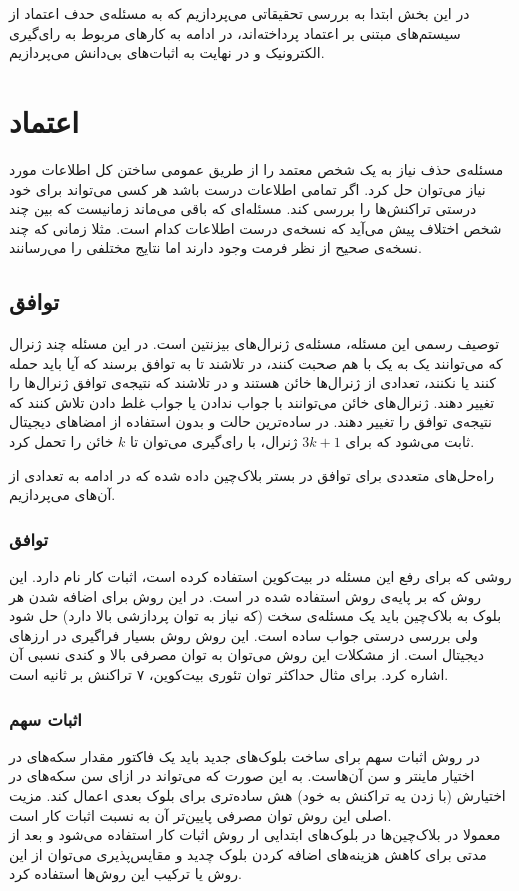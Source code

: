 در این بخش ابتدا به بررسی تحقیقاتی می‌پردازیم که به مسئله‌ی حدف اعتماد از سیستم‌های مبتنی بر اعتماد پرداخته‌اند، در ادامه به کارهای مربوط به رای‌گیری الکترونیک و در نهایت به اثبات‌های بی‌دانش می‌پردازیم.

\section{اعتماد}
مسئله‌ی حذف نیاز به یک شخص معتمد را از طریق عمومی ساختن کل اطلاعات مورد نیاز می‌توان حل کرد. اگر تمامی اطلاعات درست باشد هر کسی می‌تواند برای خود درستی تراکنش‌ها را بررسی کند. مسئله‌ای که باقی می‌ماند زمانیست که بین چند شخص اختلاف پیش می‌آید که نسخه‌ی درست اطلاعات کدام است. مثلا زمانی که چند نسخه‌ی صحیح از نظر فرمت وجود دارند اما نتایج مختلفی را می‌رسانند. 
\subsection{توافق}
توصیف رسمی این مسئله، مسئله‌ی ژنرال‌های بیزنتین 
\cite{byzantine}
است. در این مسئله چند ژنرال که می‌توانند یک به یک با هم صحبت کنند، در تلاشند تا به توافق برسند که آیا باید حمله کنند یا نکنند، تعدادی از ژنرال‌ها خائن هستند و در تلاشند که نتیجه‌ی توافق ژنرال‌ها را تغییر دهند. ژنرال‌های خائن می‌توانند با جواب ندادن یا جواب غلط دادن تلاش کنند که نتیجه‌ی توافق را تغییر دهند. در ساده‌ترین حالت و بدون استفاده از امضا‌های دیجیتال ثابت می‌شود که برای $ 3k + 1 $ ژنرال، با رای‌گیری می‌توان تا $ k $ خائن را تحمل کرد. 
\par
راه‌حل‌های متعددی برای توافق 
در بستر بلاک‌چین داده شده که در ادامه به تعدادی از آن‌های می‌پردازیم.
\subsubsection{توافق}
روشی که 
\cite{bitcoin}
برای رفع این مسئله در بیت‌کوین استفاده کرده است، اثبات کار 
نام دارد. این روش که بر پایه‌ی روش استفاده شده در 
\cite{hashcash}
است. در این روش برای اضافه شدن هر بلوک به بلاک‌چین باید یک مسئله‌ی سخت (که نیاز به توان پردازشی بالا دارد) حل شود ولی بررسی درستی جواب ساده است. این روش روش بسیار فراگیری در ارز‌های دیجیتال است. از مشکلات این روش می‌توان به توان مصرفی بالا و کندی نسبی آن اشاره کرد. برای مثال حداکثر توان تئوری بیت‌کوین، ۷ تراکنش بر ثانیه است. 
\subsubsection{اثبات سهم}
در روش اثبات سهم
\cite{PoS}
برای ساخت بلوک‌های جدید باید یک فاکتور مقدار سکه‌های در اختیار ماینتر و سن آن‌هاست. به این صورت که می‌تواند در ازای سن‌ سکه‌های در اختیارش (با زدن یه تراکنش به خود) هش ساده‌تری برای بلوک بعدی اعمال کند. مزیت اصلی این روش توان مصرفی پایین‌تر آن به نسبت اثبات کار است. 
\\
معمولا در بلاک‌چین‌ها در بلوک‌های ابتدایی ار روش اثبات کار استفاده می‌شود و بعد از مدتی برای کاهش هزینه‌های اضافه کردن بلوک چدید و مقایس‌پذیری می‌توان از این روش یا ترکیب این روش‌ها استفاده کرد.

